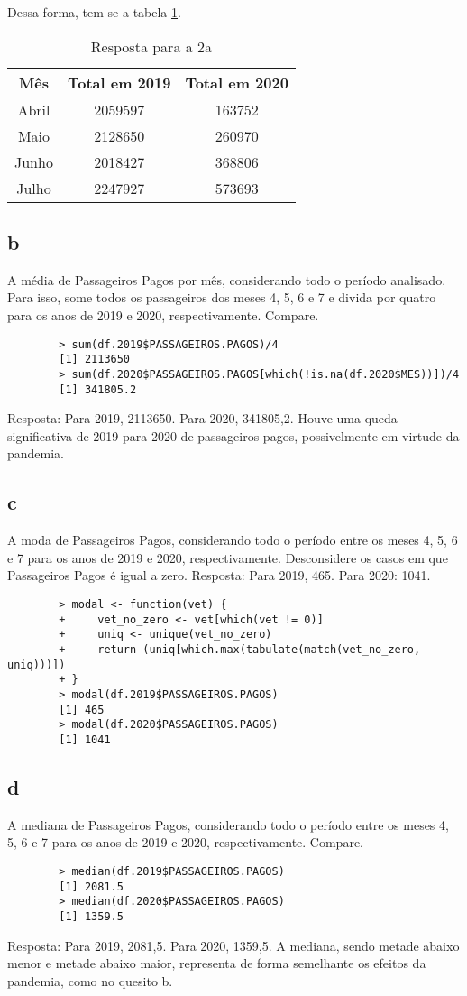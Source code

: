\documentclass{article}[twocolumn]
\begin{document}
	Dessa forma, tem-se a tabela \ref{tab:2a}.
	\begin{table}[H]
		\centering
		\begin{tabular}{ccc}
			\hline
			Mês & Total em 2019 & Total em 2020\\
			\hline
			Abril & 2059597 & 163752\\
			Maio & 2128650 & 260970\\
			Junho & 2018427 & 368806\\
			Julho & 2247927 & 573693\\
			\hline
		\end{tabular}
		\caption{Resposta para a 2a}
		\label{tab:2a}
	\end{table}
	\subsection{b}
	A média de Passageiros Pagos por mês, considerando todo o período analisado. Para
	isso, some todos os passageiros dos meses 4, 5, 6 e 7 e divida por quatro para os anos
	de 2019 e 2020, respectivamente. Compare.
	\begin{verbatim}
		> sum(df.2019$PASSAGEIROS.PAGOS)/4
		[1] 2113650
		> sum(df.2020$PASSAGEIROS.PAGOS[which(!is.na(df.2020$MES))])/4
		[1] 341805.2
	\end{verbatim}
	Resposta: Para 2019, 2113650. Para 2020, 341805,2. Houve uma queda significativa de 2019 para
	2020 de passageiros pagos, possivelmente em virtude da pandemia.
	\subsection{c}
	A moda de Passageiros Pagos, considerando todo o período entre os meses 4, 5, 6 e 7
	para os anos de 2019 e 2020, respectivamente. Desconsidere os casos em que
	Passageiros Pagos é igual a zero.
	Resposta: Para 2019, 465. Para 2020: 1041.
	\begin{verbatim}
		> modal <- function(vet) {
		+     vet_no_zero <- vet[which(vet != 0)]
		+     uniq <- unique(vet_no_zero)
		+     return (uniq[which.max(tabulate(match(vet_no_zero, uniq)))])
		+ }
		> modal(df.2019$PASSAGEIROS.PAGOS)
		[1] 465
		> modal(df.2020$PASSAGEIROS.PAGOS)
		[1] 1041
	\end{verbatim}
	\subsection{d}
	A mediana de Passageiros Pagos, considerando todo o período entre os meses 4, 5, 6 e
	7 para os anos de 2019 e 2020, respectivamente. Compare.
	\begin{verbatim}
		> median(df.2019$PASSAGEIROS.PAGOS)
		[1] 2081.5
		> median(df.2020$PASSAGEIROS.PAGOS)
		[1] 1359.5
	\end{verbatim}
	Resposta: Para 2019, 2081,5. Para 2020, 1359,5. A mediana, sendo metade abaixo menor
	e metade abaixo maior, representa de forma semelhante os efeitos da pandemia, como no quesito
	b.
\end{document}
